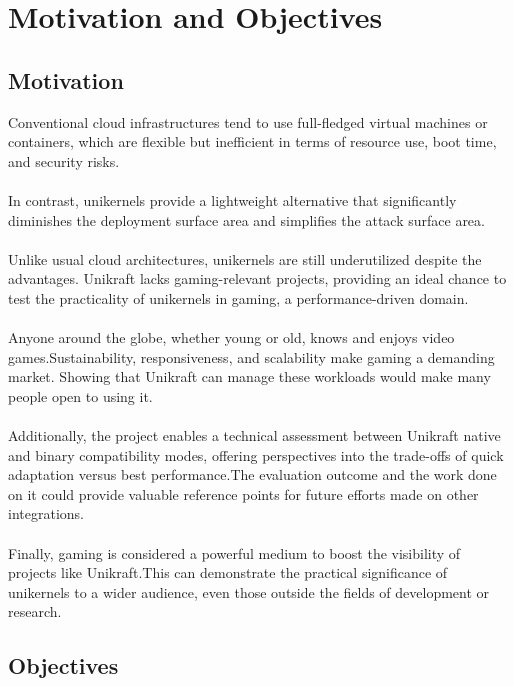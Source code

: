\chapter{Motivation and Objectives}
\label{chapter:mot&obj}

\section{Motivation}
\label{sec:motivation}

Conventional cloud infrastructures tend to use full-fledged virtual machines or containers, which are flexible but inefficient in terms of resource use, boot time, and security risks. \\ \\
In contrast, unikernels provide a lightweight alternative that significantly diminishes the deployment surface area and simplifies the attack surface area. \\ \\
Unlike usual cloud architectures, unikernels are still underutilized despite the advantages. Unikraft lacks gaming-relevant projects, providing an ideal chance to test the practicality of unikernels in gaming, a performance-driven domain. \\ \\
Anyone around the globe, whether young or old, knows and enjoys video games.\@ Sustainability, responsiveness, and scalability make gaming a demanding market. Showing that Unikraft can manage these workloads would make many people open to using it. \\ \\
Additionally, the project enables a technical assessment between Unikraft native and binary compatibility modes, offering perspectives into the trade-offs of quick adaptation versus best performance.\@ The evaluation outcome and the work done on it could provide valuable reference points for future efforts made on other integrations. \\ \\
Finally, gaming is considered a powerful medium to boost the visibility of projects like Unikraft.\@ This can demonstrate the practical significance of unikernels to a wider audience, even those outside the fields of development or research.
\section{Objectives}
\label{sec:objecties}

